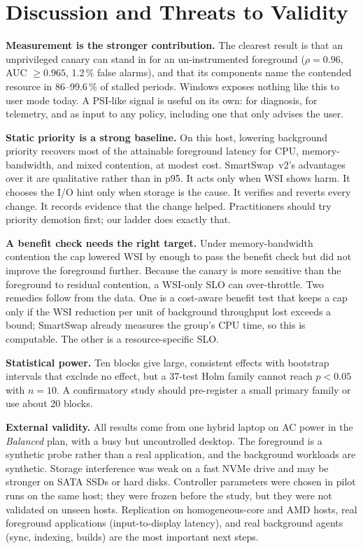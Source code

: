 \section{Discussion and Threats to Validity}
\label{sec:discussion}

\textbf{Measurement is the stronger contribution.} The clearest result is that an unprivileged canary can stand in for an un-instrumented foreground ($\rho=0.96$, AUC $\geq0.965$, 1.2\,\% false alarms), and that its components name the contended resource in 86--99.6\,\% of stalled periods. Windows exposes nothing like this to user mode today. A PSI-like signal is useful on its own: for diagnosis, for telemetry, and as input to any policy, including one that only advises the user.

\textbf{Static priority is a strong baseline.} On this host, lowering background priority recovers most of the attainable foreground latency for CPU, memory-bandwidth, and mixed contention, at modest cost. SmartSwap~v2's advantages over it are qualitative rather than in p95. It acts only when WSI shows harm. It chooses the I/O hint only when storage is the cause. It verifies and reverts every change. It records evidence that the change helped. Practitioners should try priority demotion first; our ladder does exactly that.

\textbf{A benefit check needs the right target.} Under memory-bandwidth contention the cap lowered WSI by enough to pass the benefit check but did not improve the foreground further. Because the canary is more sensitive than the foreground to residual contention, a WSI-only SLO can over-throttle. Two remedies follow from the data. One is a cost-aware benefit test that keeps a cap only if the WSI reduction per unit of background throughput lost exceeds a bound; SmartSwap already measures the group's CPU time, so this is computable. The other is a resource-specific SLO.

\textbf{Statistical power.} Ten blocks give large, consistent effects with bootstrap intervals that exclude no effect, but a 37-test Holm family cannot reach $p<0.05$ with $n=10$. A confirmatory study should pre-register a small primary family or use about 20 blocks.

\textbf{External validity.} All results come from one hybrid laptop on AC power in the \emph{Balanced} plan, with a busy but uncontrolled desktop. The foreground is a synthetic probe rather than a real application, and the background workloads are synthetic. Storage interference was weak on a fast NVMe drive and may be stronger on SATA SSDs or hard disks. Controller parameters were chosen in pilot runs on the same host; they were frozen before the study, but they were not validated on unseen hosts. Replication on homogeneous-core and AMD hosts, real foreground applications (input-to-display latency), and real background agents (sync, indexing, builds) are the most important next steps.

